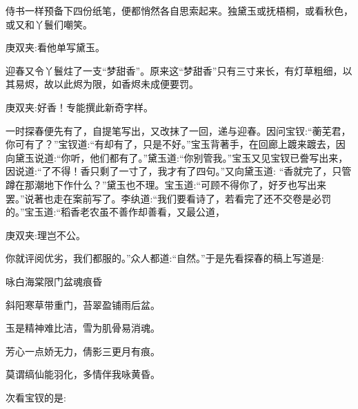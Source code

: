 \begin{parag}
    侍书一样预备下四份纸笔，便都悄然各自思索起来。独黛玉或抚梧桐，或看秋色，或又和丫鬟们嘲笑。\begin{note}庚双夹:看他单写黛玉。\end{note}迎春又令丫鬟炷了一支“梦甜香”。原来这“梦甜香”只有三寸来长，有灯草粗细，以其易烬，故以此烬为限，如香烬未成便要罚。\begin{note}庚双夹:好香！专能撰此新奇字样。\end{note}一时探春便先有了，自提笔写出，又改抹了一回，递与迎春。因问宝钗:“蘅芜君，你可有了？”宝钗道:“有却有了，只是不好。”宝玉背著手，在回廊上踱来踱去，因向黛玉说道:“你听，他们都有了。”黛玉道:“你别管我。”宝玉又见宝钗已誊写出来，因说道:“了不得！香只剩了一寸了，我才有了四句。”又向黛玉道: “香就完了，只管蹲在那潮地下作什么？”黛玉也不理。宝玉道:“可顾不得你了，好歹也写出来罢。”说著也走在案前写了。李纨道:“我们要看诗了，若看完了还不交卷是必罚的。”宝玉道:“稻香老农虽不善作却善看，又最公道，\begin{note}庚双夹:理岂不公。\end{note}你就评阅优劣，我们都服的。”众人都道:“自然。”于是先看探春的稿上写道是:
\end{parag}


\begin{poem}
    \begin{pl}咏白海棠限门盆魂痕昏\end{pl}

    \begin{pl}斜阳寒草带重门，苔翠盈铺雨后盆。\end{pl}

    \begin{pl}玉是精神难比洁，雪为肌骨易消魂。\end{pl}

    \begin{pl}芳心一点娇无力，倩影三更月有痕。\end{pl}

    \begin{pl}莫谓缟仙能羽化，多情伴我咏黄昏。\end{pl}
\end{poem}


\begin{parag}
    次看宝钗的是:
\end{parag}


